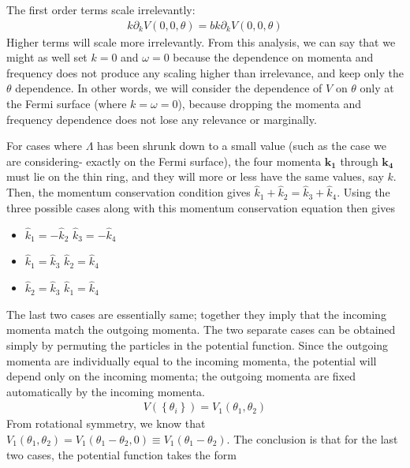 \documentclass[14pt]{extarticle}
\begin{document}
The first order terms scale irrelevantly:
\begin{equation}\begin{aligned}
k \partial_k V(0,0,\theta) = bk \partial_k V(0,0,\theta)
\end{aligned}\end{equation}
Higher terms will scale more irrelevantly. From this analysis, we can say that we might as well set \(k=0\) and \(\omega=0\) because the dependence on momenta and frequency does not produce any scaling higher than irrelevance, and keep only the \(\theta\) dependence. In other words, we will consider the dependence of \(V\) on \(\theta\) only at the Fermi surface (where \(k=\omega=0\)), because dropping the momenta and frequency dependence does not lose any relevance or marginally.
 
For cases where \(\Lambda\) has been shrunk down to a small value (such as the case we are considering- exactly on the Fermi surface), the four momenta \(\mathbf{k_1}\) through \(\mathbf{k_4}\) must lie on the thin ring, and they will more or less have the same values, say \(k\). Then, the momentum conservation condition gives \(\hat k_1 + \hat k_2 = \hat k_3 + \hat k_4\). Using the three possible cases along with this momentum conservation equation then gives
\begin{itemize}
	\item \(\hat k_1 = - \hat k_2\)  \(\hat k_3 = - \hat k_4\)\\
	\item \(\hat k_1 = \hat k_3\)  \(\hat k_2 = \hat k_4\)\\
	\item \(\hat k_2 = \hat k_3\)  \(\hat k_1 = \hat k_4\)
\end{itemize}
The last two cases are essentially same; together they imply that the incoming momenta match the outgoing momenta. The two separate cases can be obtained simply by permuting the particles in the potential function. Since the outgoing momenta are individually equal to the incoming momenta, the potential will depend only on the incoming momenta; the outgoing momenta are fixed automatically by the incoming momenta. 
\begin{equation}\begin{aligned}
	V(\left\{\theta_i\right\}) = V_1(\theta_1,\theta_2)
\end{aligned}\end{equation}
From rotational symmetry, we know that \(V_1(\theta_1,\theta_2) = V_1(\theta_1 - \theta_2,0) \equiv V_1(\theta_1 - \theta_2)\). The conclusion is that for the last two cases, the potential function takes the form
\end{document}
